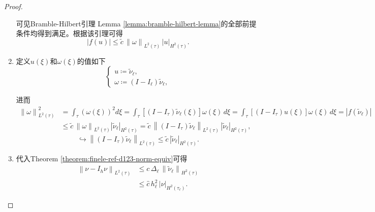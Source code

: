 \begin{proof}
\begin{enumerate}
  可见Bramble-Hilbert引理 Lemma \ref{lemma:bramble-hilbert-lemma}的全部前提条件均得到满足。根据该引理可得
  \begin{equation*}
    \left| f(u) \right| \le \widetilde{c} \, \left\| \omega \right\|_{L^{2}(\tau)} \, \left| u \right|_{H^{2}(\tau)}.
  \end{equation*}

  \item 定义$u(\xi)$和$\omega(\xi)$的值如下
  \begin{equation*}
    \begin{cases}
      u \coloneqq \widetilde{\nu}_{\ell}, \\
      \omega \coloneqq \left( I - I_{\ell} \right) \widetilde{\nu}_{\ell},
    \end{cases}
  \end{equation*}

  进而
  \begin{equation*}
    \begin{split}
      \left\| \omega \right\|_{L^{2}(\tau)}^{2}
      & = \int_{\tau} \left( \omega (\xi) \right)^{2} d \xi
      = \int_{\tau} \left[
      \left( I - I_{\tau} \right)
      \widetilde{\nu}_{\ell}(\xi)
      \right] \omega(\xi) \, d \xi
      = \int_{\tau} \left[
      \left( I - I_{\tau} \right) u(\xi)
      \right]
      \omega(\xi) \, d \xi
      = \left| f \left( \widetilde{\nu}_{\ell} \right) \right| \\
      & \le \widetilde{c} \,
      \left\| \omega \right\|_{L^{2}(\tau)}
      \left| \widetilde{\nu}_{\ell} \right|_{H^{2}(\tau)} = \widetilde{c} \,
      \left\| \left( I - I_{\tau} \right) \widetilde{\nu}_{\ell} \right\|_{L^{2}(\tau)}
      \, \left| \widetilde{\nu}_{\ell} \right|_{H^{2}(\tau)},
    \end{split}
  \end{equation*}
  \begin{equation*}
    \hookrightarrow
    \left\| \left( I - I_{\tau} \right) \widetilde{\nu}_{\ell} \right\|_{L^{2}(\tau)} \le \widetilde{c} \, \left| \widetilde{\nu}_{\ell} \right|_{H^{2}(\tau)}.
  \end{equation*}
  \item 代入Theorem \ref{theorem:finele-ref-d123-norm-equiv}可得
  \begin{equation*}
    \begin{split}
      \left\| \nu - I_{h} \nu \right\|_{L^{2}(\tau)}
      & \le c \, \Delta_{\ell} \,
      \left\| \widetilde{\nu}_{\ell} \right\|_{H^{2}(\tau)} \\
      & \le \hat{c} \, h_{\ell}^{2} \, \left| \nu \right|_{H^{2}(\tau_{\ell})}.
    \end{split}
  \end{equation*}
\end{enumerate}
\end{proof}


